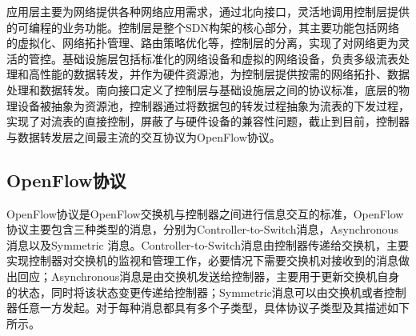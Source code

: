 应用层主要为网络提供各种网络应用需求，通过北向接口，灵活地调用控制层提供的可编程的业务功能。控制层是整个SDN构架的核心部分，其主要功能包括网络的虚拟化、网络拓扑管理、路由策略优化等，控制层的分离，实现了对网络更为灵活的管控。基础设施层包括标准化的网络设备和虚拟的网络设备，负责多级流表处理和高性能的数据转发，并作为硬件资源池，为控制层提供按需的网络拓扑、数据处理和数据转发。南向接口定义了控制层与基础设施层之间的协议标准，底层的物理设备被抽象为资源池，控制器通过将数据包的转发过程抽象为流表的下发过程，实现了对流表的直接控制，屏蔽了与硬件设备的兼容性问题，截止到目前，控制器与数据转发层之间最主流的交互协议为OpenFlow协议\cite{openflow-9}。
\subsection{OpenFlow协议}
OpenFlow协议是OpenFlow交换机与控制器之间进行信息交互的标准，OpenFlow协议主要包含三种类型的消息，分别为Controller-to-Switch消息，Asynchronous 消息以及Symmetric 消息。Controller-to-Switch消息由控制器传递给交换机，主要实现控制器对交换机的监视和管理工作，必要情况下需要交换机对接收到的消息做出回应；Asynchronous消息是由交换机发送给控制器，主要用于更新交换机自身的状态，同时将该状态变更传递给控制器；Symmetric消息可以由交换机或者控制器任意一方发起\cite{openflow-5}。对于每种消息都具有多个子类型，具体协议子类型及其描述如下所示。

